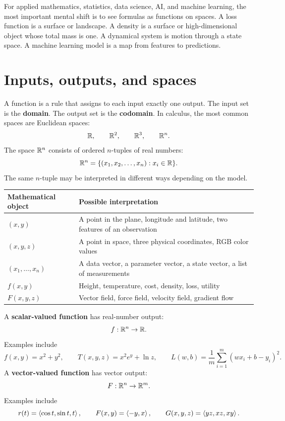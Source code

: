 \begin{bridgebox}[title={Bridge to MS preparation}]
For applied mathematics, statistics, data science, AI, and machine learning, the most important mental shift is to see formulas as functions on spaces. A loss function is a surface or landscape. A density is a surface or high-dimensional object whose total mass is one. A dynamical system is motion through a state space. A machine learning model is a map from features to predictions.
\end{bridgebox}

\section{Inputs, outputs, and spaces}

A function is a rule that assigns to each input exactly one output. The input set is the \textbf{domain}. The output set is the \textbf{codomain}. In calculus, the most common spaces are Euclidean spaces:
\[
  \mathbb{R},\qquad \mathbb{R}^2,\qquad \mathbb{R}^3,\qquad \mathbb{R}^n.
\]
The space $\mathbb{R}^n$ consists of ordered $n$-tuples of real numbers:
\[
  \mathbb{R}^n=\{(x_1,x_2,\dots,x_n):x_i\in\mathbb{R}\}.
\]
The same $n$-tuple may be interpreted in different ways depending on the model.

\begin{center}
\begin{tabularx}{0.95\textwidth}{>{\raggedright\arraybackslash}p{} X}
\toprule
\textbf{Mathematical object} & \textbf{Possible interpretation}\\
\midrule
$(x,y)$ & A point in the plane, longitude and latitude, two features of an observation\\
$(x,y,z)$ & A point in space, three physical coordinates, RGB color values\\
$(x_1,\dots,x_n)$ & A data vector, a parameter vector, a state vector, a list of measurements\\
$f(x,y)$ & Height, temperature, cost, density, loss, utility\\
$F(x,y,z)$ & Vector field, force field, velocity field, gradient flow\\
\bottomrule
\end{tabularx}
\end{center}

\begin{definitionbox}[title={Scalar-valued and vector-valued functions}]
A \textbf{scalar-valued function} has real-number output:
\[
  f:\mathbb{R}^n\to\mathbb{R}.
\]
Examples include
\[
  f(x,y)=x^2+y^2,
  \qquad
  T(x,y,z)=x^2e^y+\ln z,
  \qquad
  L(w,b)=\frac1m\sum_{i=1}^m(wx_i+b-y_i)^2.
\]
A \textbf{vector-valued function} has vector output:
\[
  F:\mathbb{R}^n\to\mathbb{R}^m.
\]
Examples include
\[
  r(t)=\left\langle \cos t,\sin t,t\right\rangle,
  \qquad
  F(x,y)=\left\langle -y,x\right\rangle,
  \qquad
  G(x,y,z)=\left\langle yz,xz,xy\right\rangle.
\]
\end{definitionbox}

